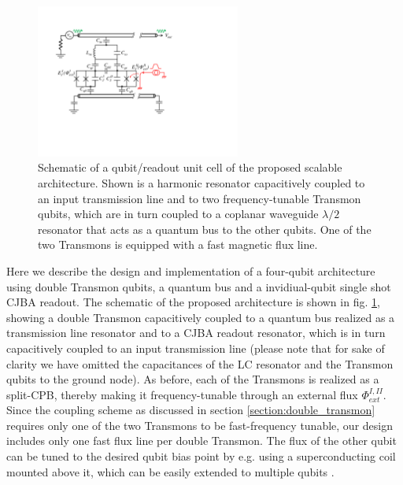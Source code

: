 \begin{figure}
	\centering
	\includegraphics[width=0.6\textwidth]{./material/figures/scalable-architecture/double_transmon_architecture_schematic}
	\caption[]{Schematic of a qubit/readout unit cell of the proposed scalable architecture. Shown is a harmonic resonator capacitively coupled to an input transmission line and to two frequency-tunable Transmon qubits, which are in turn coupled to a coplanar waveguide $\lambda/2$ resonator that acts as a quantum bus to the other qubits. One of the two Transmons is equipped with a fast magnetic flux line.}
	\label{fig:scalable_architecture_schematic}
\end{figure}

Here we describe the design and implementation of a four-qubit architecture using double Transmon qubits, a quantum bus and a invidiual-qubit single shot CJBA readout. The schematic of the proposed architecture is shown in fig. \ref{fig:scalable_architecture_schematic}, showing a double Transmon capacitively coupled to a quantum bus realized as a transmission line resonator and to a CJBA readout resonator, which is in turn capacitively coupled to an input transmission line (please note that for sake of clarity we have omitted the capacitances of the LC resonator and the Transmon qubits to the ground node). As before, each of the Transmons is realized as a split-CPB, thereby making it frequency-tunable through an external flux $\Phi_{ext}^{I,II}$. Since the coupling scheme as discussed in section \ref{section:double_transmon} requires only one of the two Transmons to be fast-frequency tunable, our design includes only one fast flux line per double Transmon. The flux of the other qubit can be tuned to the desired qubit bias point by e.g. using a superconducting coil mounted above it, which can be easily extended to multiple qubits \citep{baur_realizing_2012}.

\smallskip

